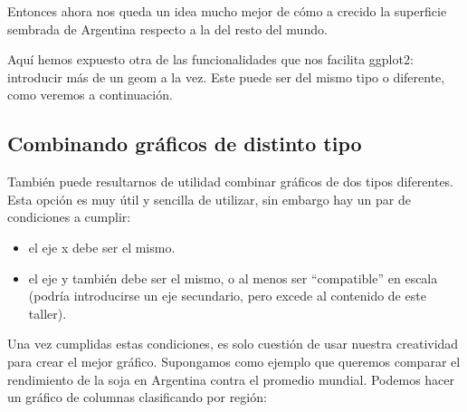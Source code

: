 \documentclass[
  letterpaper,
  DIV=11,
  numbers=noendperiod]{scrartcl}
\providecommand{\tightlist}{%
  \setlength{\itemsep}{0pt}\setlength{\parskip}{0pt}}\usepackage{longtable,booktabs,array}
\begin{document}
Entonces ahora nos queda un idea mucho mejor de cómo a crecido la
superficie sembrada de Argentina respecto a la del resto del mundo.

Aquí hemos expuesto otra de las funcionalidades que nos facilita
ggplot2: introducir más de un geom a la vez. Este puede ser del mismo
tipo o diferente, como veremos a continuación.

\hypertarget{combinando-gruxe1ficos-de-distinto-tipo}{%
\subsection{Combinando gráficos de distinto
tipo}\label{combinando-gruxe1ficos-de-distinto-tipo}}

También puede resultarnos de utilidad combinar gráficos de dos tipos
diferentes. Esta opción es muy útil y sencilla de utilizar, sin embargo
hay un par de condiciones a cumplir:

\begin{itemize}
\tightlist
\item
  el eje x debe ser el mismo.
\item
  el eje y también debe ser el mismo, o al menos ser ``compatible'' en
  escala (podría introducirse un eje secundario, pero excede al
  contenido de este taller).
\end{itemize}

Una vez cumplidas estas condiciones, es solo cuestión de usar nuestra
creatividad para crear el mejor gráfico. Supongamos como ejemplo que
queremos comparar el rendimiento de la soja en Argentina contra el
promedio mundial. Podemos hacer un gráfico de columnas clasificando por
región:
\end{document}

